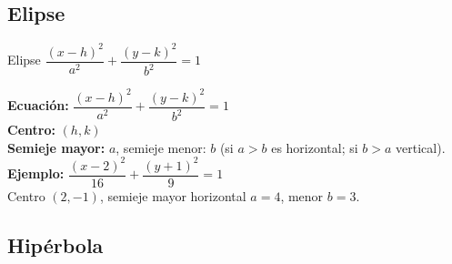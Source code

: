 \documentclass[12pt,a4paper]{article}
\begin{document}
\subsection{Elipse}
\begin{funcbox}{Elipse $\dfrac{(x-h)^2}{a^2}+\dfrac{(y-k)^2}{b^2}=1$}
\begin{minipage}[t]{0.55\textwidth}
    \textbf{Ecuación:} $\dfrac{(x-h)^2}{a^2}+\dfrac{(y-k)^2}{b^2}=1$\\
    \textbf{Centro:} $(h,k)$\\
    \textbf{Semieje mayor:} $a$, semieje menor: $b$ (si $a>b$ es horizontal; si $b>a$ vertical).\\
    \textbf{Ejemplo:} $\dfrac{(x-2)^2}{16}+\dfrac{(y+1)^2}{9}=1$\\
    Centro $(2,-1)$, semieje mayor horizontal $a=4$, menor $b=3$.
\end{minipage}\hfill
\begin{minipage}[t]{0.4\textwidth}
    \centering
\end{minipage}
\end{funcbox}

\subsection{Hipérbola}
\end{document}
